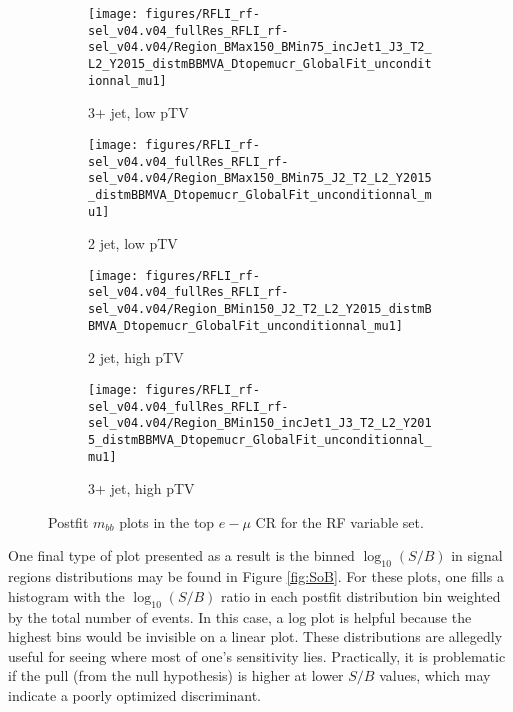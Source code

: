 \begin{figure}[!htbp]\captionsetup{justification=centering}
    \centering
\begin{subfigure}[t]{0.45000\textwidth}\centering\texttt{[image: figures/RFLI\_rf-sel\_v04.v04\_fullRes\_RFLI\_rf-sel\_v04.v04/Region\_BMax150\_BMin75\_incJet1\_J3\_T2\_L2\_Y2015\_distmBBMVA\_Dtopemucr\_GlobalFit\_unconditionnal\_mu1]}\caption{3+ jet, low pTV}\end{subfigure}
\begin{subfigure}[t]{0.45000\textwidth}\centering\texttt{[image: figures/RFLI\_rf-sel\_v04.v04\_fullRes\_RFLI\_rf-sel\_v04.v04/Region\_BMax150\_BMin75\_J2\_T2\_L2\_Y2015\_distmBBMVA\_Dtopemucr\_GlobalFit\_unconditionnal\_mu1]}\caption{2 jet, low pTV}\end{subfigure}
\begin{subfigure}[t]{0.45000\textwidth}\centering\texttt{[image: figures/RFLI\_rf-sel\_v04.v04\_fullRes\_RFLI\_rf-sel\_v04.v04/Region\_BMin150\_J2\_T2\_L2\_Y2015\_distmBBMVA\_Dtopemucr\_GlobalFit\_unconditionnal\_mu1]}\caption{2 jet, high pTV}\end{subfigure}
\begin{subfigure}[t]{0.45000\textwidth}\centering\texttt{[image: figures/RFLI\_rf-sel\_v04.v04\_fullRes\_RFLI\_rf-sel\_v04.v04/Region\_BMin150\_incJet1\_J3\_T2\_L2\_Y2015\_distmBBMVA\_Dtopemucr\_GlobalFit\_unconditionnal\_mu1]}\caption{3+ jet, high pTV}\end{subfigure}
  \caption{Postfit $m_{bb}$ plots in the top $e-\mu$ CR for the RF variable set.}
  \label{fig:RFPostfittopemu}
\end{figure}

One final type of plot presented as a result is the binned $\log_{10}\left(S/B\right)$ in signal regions distributions may be found in Figure \ref{fig:SoB}.  For these plots, one fills a histogram with the $\log_{10}\left(S/B\right)$ ratio in each postfit distribution bin weighted by the total number of events.  In this case, a log plot is helpful because the highest bins would be invisible on a linear plot.  These distributions are allegedly useful for seeing where most of one's sensitivity lies.  Practically, it is problematic if the pull (from the null hypothesis) is higher at lower $S/B$ values, which may indicate a poorly optimized discriminant.  

